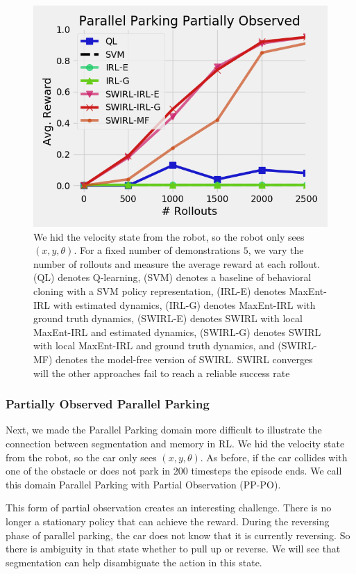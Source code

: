 \begin{figure}[t]
\centering
 \includegraphics[width=\columnwidth]{new-exp/pp-po.png}
 \caption{We hid the velocity state from the robot, so the robot only sees $(x,y,\theta)$. For a fixed number of demonstrations $5$, we vary the number of rollouts and measure the average reward at each rollout. (QL) denotes Q-learning, (SVM) denotes a baseline of behavioral cloning with a SVM policy representation, (IRL-E) denotes MaxEnt-IRL with estimated dynamics, (IRL-G) denotes MaxEnt-IRL with ground truth dynamics, (SWIRL-E) denotes SWIRL with local MaxEnt-IRL and estimated dynamics, (SWIRL-G) denotes SWIRL with local MaxEnt-IRL and ground truth dynamics, and (SWIRL-MF) denotes the model-free version of SWIRL. SWIRL converges will the other approaches fail to reach a reliable success rate \label{exp:pp-po}}
\end{figure}


\subsubsection{Partially Observed Parallel Parking}
Next, we made the Parallel Parking domain more difficult to illustrate the connection between segmentation and memory in RL. 
We hid the velocity state from the robot, so the car only sees $(x,y,\theta)$. 
As before, if the car collides with one of the obstacle or does not park in 200 timesteps the episode ends.
We call this domain Parallel Parking with Partial Observation (PP-PO).

This form of partial observation creates an interesting challenge.
There is no longer a stationary policy that can achieve the reward.
During the reversing phase of parallel parking, the car does not know that it is currently reversing.
So there is ambiguity in that state whether to pull up or reverse.
We will see that segmentation can help disambiguate the action in this state.

